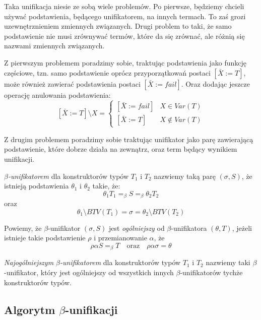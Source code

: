 \documentclass[11pt,leqno]{article}
\begin{document}
Taka unifikacja niesie ze sobą wiele problemów. Po pierwsze, będziemy chcieli używać podstawienia,
będącego unifikatorem, na innych termach. To zaś grozi uzewnętrznieniem zmiennych związanych. Drugi
problem to taki, że samo podstawienie nie musi zrównywać termów, które da się zrównać, ale różnią się
nazwami zmiennych związanych.

Z pierwszym problemem poradzimy sobie, traktując podstawienia jako funkcję częściowe, tzn. samo podstawienie
oprócz przyporzątkowań postaci $[\bar{X} := T]$, może również zawierać podstawienia postaci $[\bar{X} := fail]$.
Oraz dodając jeszcze operację anulowania podstawienia:
\[
[\bar{X} := T] \setminus X = 
\begin{cases}
[\bar{X} := fail] & X \in    Var(T) \\
[\bar{X} := T]    & X \notin Var(T)
\end{cases}
\]

Z drugim problemem poradzimy sobie traktując unifikator jako parę zawierającą podstawienie, które dobrze działa
na zewnątrz, oraz term będący wynikiem unifikacji.

\begin{definicja}
\emph{$\beta$-unifikatorem} dla konstruktorów typów $T_1$ i $T_2$ nazwiemy taką parę $(\sigma, S)$, że istnieją
podstawienia $\theta_1$ i $\theta_2$ takie, że:
\[
\theta_1 T_1 =_\beta S =_\beta \theta_2 T_2
\]
oraz
\[
\theta_1 \setminus BTV(T_1) = \sigma = \theta_2 \setminus BTV(T_2)
\]
\end{definicja}

\begin{definicja}
Powiemy, że $\beta$-unifikator $(\sigma, S)$ jest \emph{ogólniejszy} od $\beta$-unifikatora
$(\theta, T)$, jeżeli istnieje takie podstawienie $\rho$ i przemianowanie $\alpha$, że
\[
\rho\alpha S =_\beta T \quad \textrm{oraz} \quad \rho\alpha\sigma = \theta
\]
\end{definicja}

\begin{definicja}
\emph{Najogólniejszym $\beta$-unifikatorem} dla konstruktorów typów $T_1$ i $T_2$ nazwiemy taki $\beta$-unifikator,
który jest ogólniejszy od wszystkich innych $\beta$-unifikatorów tychże konstruktorów typów.
\end{definicja}

\subsection{Algorytm $\beta$-unifikacji}
\end{document}
